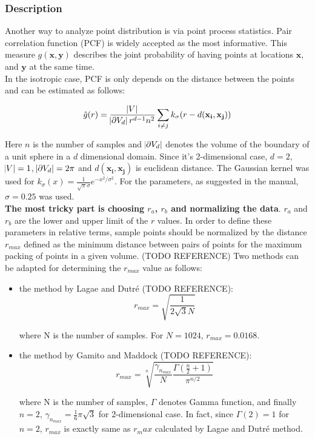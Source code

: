 \documentclass[paper=a4, fontsize=11pt]{scrartcl} %
\numberwithin{equation}{section} %
\numberwithin{figure}{section} %
\numberwithin{table}{section} %
\renewcommand{\vec}[1]{\mathbf{#1}}
\begin{document}
\subsubsection{Description}

Another way to analyze point distribution is via point process statistics. Pair correlation function (PCF) is widely accepted as the most informative. This measure $g(\vec{x}, \vec{y})$ describes the joint probability of having points at locations $\vec{x}$, and $\vec{y}$ at the same time. 
\\

In the isotropic case, PCF is only depends on the distance between the points and can be estimated as follows:

\begin{equation}
	\hat{g}(r) = \frac{\abs{V}}{\abs{\partial V_d} r^{d-1} n^2} \sum_{i \neq j} k_\sigma (r - d(\vec{x_i}, \vec{x_j}))
\end{equation}

Here $n$ is the number of samples and $\abs{\partial V_d}$ denotes the volume of the boundary of a unit sphere in a $d$ dimensional domain. Since it's 2-dimensional case, $d = 2$, $\abs{V} = 1$, $\abs{\partial V_d} = 2 \pi$ and $d(\vec{x_i}, \vec{x_j})$ is euclidean distance. The Gaussian kernel was used for $k_\sigma(x) = \frac{1}{\sqrt{\pi} \sigma} e^{-x^2 / \sigma^2}$. For the parameters, as suggested in the manual, $\sigma = 0.25$ was used. \\

\textbf{The most tricky part is choosing $r_a$, $r_b$ and normalizing the data}. $r_a$ and $r_b$ are the lower and upper limit of the $r$ values. In order to define these parameters in relative terms, sample points should be normalized by the distance $r_{max}$ defined as the minimum distance between pairs of points for the maximum packing of points in a given volume. (TODO REFERENCE) Two methods can be adapted for determining the $r_{max}$ value as follows:

\begin{itemize}
	\item the method by Lagae and Dutr\'{e} (TODO REFERENCE):
	\begin{equation}
		r_{max} = \sqrt{\frac{1}{2\sqrt{3} N}}
	\end{equation}
	
	where N is the number of samples. For $N = 1024$, $r_{max} = 0.0168$.
	
	\item the method by Gamito and Maddock (TODO REFERENCE): 
	\begin{equation}
		r_{max} = \sqrt[n]{\frac{\gamma_{n_{max}}}{N} \frac{\Gamma(\frac{n}{2} + 1)}{\pi^{n/2}}}
	\end{equation}  
	
	where N is the number of samples, $\Gamma$ denotes Gamma function, and finally $n = 2$, $\gamma_{n_{max}} = \frac{1}{6} \pi \sqrt{3}$ for 2-dimensional case. In fact, since $\Gamma(2) = 1$ for $n = 2$, $r_{max}$ is exactly same as $r_max$ calculated by Lagae and Dutr\'{e} method.
\end{itemize}
\end{document}
